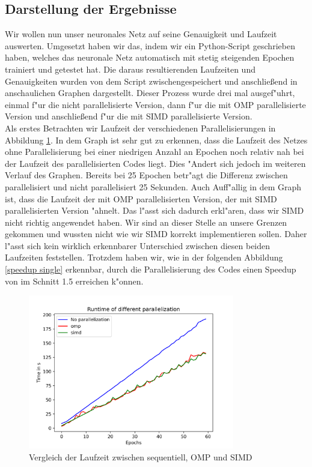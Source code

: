 \documentclass[12pt,a4paper]{scrartcl}
\begin{document}
\pagebreak

\subsection{Darstellung der Ergebnisse}
Wir wollen nun unser neuronales Netz auf seine Genauigkeit und Laufzeit auswerten. Umgesetzt haben wir das, indem wir ein Python-Script geschrieben haben, welches das neuronale Netz automatisch mit stetig steigenden Epochen trainiert und getestet hat. Die daraus resultierenden Laufzeiten und Genauigkeiten wurden von dem Script zwischengespeichert und anschlie\ss end in anschaulichen Graphen dargestellt. Dieser Prozess wurde drei mal ausgef"uhrt, einmal f"ur die nicht parallelisierte Version, dann f"ur die mit OMP parallelisierte Version und anschlie\ss end f"ur die mit SIMD parallelisierte Version. \\

Als erstes Betrachten wir Laufzeit der verschiedenen Parallelisierungen in Abbildung \ref{runtime single}. In dem Graph ist sehr gut zu erkennen, dass die Laufzeit des Netzes ohne Parallelisierung bei einer niedrigen Anzahl an Epochen noch relativ nah bei der Laufzeit des parallelisierten Codes liegt. Dies "Andert sich jedoch im weiteren Verlauf des Graphen. Bereits bei 25 Epochen betr"agt die Differenz zwischen parallelisiert und nicht parallelisiert 25 Sekunden. Auch Auff"allig in dem Graph ist, dass die Laufzeit der mit OMP parallelisierten Version, der mit SIMD parallelisierten Version "ahnelt. Das l"asst sich dadurch erkl"aren, dass wir SIMD nicht richtig angewendet haben. Wir sind an dieser Stelle an unsere Grenzen gekommen und  wussten nicht wie wir SIMD korrekt implementieren sollen. Daher l"asst sich kein wirklich erkennbarer Unterschied zwischen diesen beiden Laufzeiten feststellen. Trotzdem haben wir, wie in der folgenden Abbildung \ref{speedup single} erkennbar, durch die Parallelisierung des Codes einen Speedup von im Schnitt 1.5 erreichen k"onnen.


\pagebreak

\begin{figure}[h]
	\centering
	\includegraphics[width=9cm]{graphs/runtime_single.png}
	\caption{Vergleich der Laufzeit zwischen sequentiell, OMP und SIMD} \label{runtime single}
\end{figure}
\end{document}
